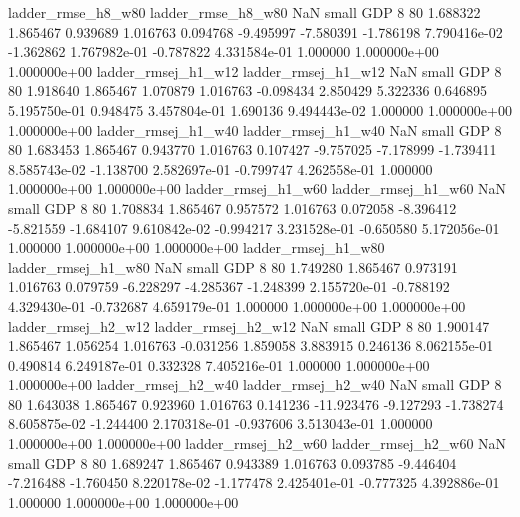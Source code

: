       ladder_rmse_h8_w80       ladder_rmse_h8_w80                   NaN      small      GDP                 8 80 1.688322       1.865467 0.939689       1.016763    0.094768     -9.495997     -7.580391    -1.786198   7.790416e-02 -1.362862 1.767982e-01    -0.787822   4.331584e-01            1.000000    1.000000e+00        1.000000e+00
     ladder_rmsej_h1_w12      ladder_rmsej_h1_w12                   NaN      small      GDP                 8 80 1.918640       1.865467 1.070879       1.016763   -0.098434      2.850429      5.322336     0.646895   5.195750e-01  0.948475 3.457804e-01     1.690136   9.494443e-02            1.000000    1.000000e+00        1.000000e+00
     ladder_rmsej_h1_w40      ladder_rmsej_h1_w40                   NaN      small      GDP                 8 80 1.683453       1.865467 0.943770       1.016763    0.107427     -9.757025     -7.178999    -1.739411   8.585743e-02 -1.138700 2.582697e-01    -0.799747   4.262558e-01            1.000000    1.000000e+00        1.000000e+00
     ladder_rmsej_h1_w60      ladder_rmsej_h1_w60                   NaN      small      GDP                 8 80 1.708834       1.865467 0.957572       1.016763    0.072058     -8.396412     -5.821559    -1.684107   9.610842e-02 -0.994217 3.231528e-01    -0.650580   5.172056e-01            1.000000    1.000000e+00        1.000000e+00
     ladder_rmsej_h1_w80      ladder_rmsej_h1_w80                   NaN      small      GDP                 8 80 1.749280       1.865467 0.973191       1.016763    0.079759     -6.228297     -4.285367    -1.248399   2.155720e-01 -0.788192 4.329430e-01    -0.732687   4.659179e-01            1.000000    1.000000e+00        1.000000e+00
     ladder_rmsej_h2_w12      ladder_rmsej_h2_w12                   NaN      small      GDP                 8 80 1.900147       1.865467 1.056254       1.016763   -0.031256      1.859058      3.883915     0.246136   8.062155e-01  0.490814 6.249187e-01     0.332328   7.405216e-01            1.000000    1.000000e+00        1.000000e+00
     ladder_rmsej_h2_w40      ladder_rmsej_h2_w40                   NaN      small      GDP                 8 80 1.643038       1.865467 0.923960       1.016763    0.141236    -11.923476     -9.127293    -1.738274   8.605875e-02 -1.244400 2.170318e-01    -0.937606   3.513043e-01            1.000000    1.000000e+00        1.000000e+00
     ladder_rmsej_h2_w60      ladder_rmsej_h2_w60                   NaN      small      GDP                 8 80 1.689247       1.865467 0.943389       1.016763    0.093785     -9.446404     -7.216488    -1.760450   8.220178e-02 -1.177478 2.425401e-01    -0.777325   4.392886e-01            1.000000    1.000000e+00        1.000000e+00
